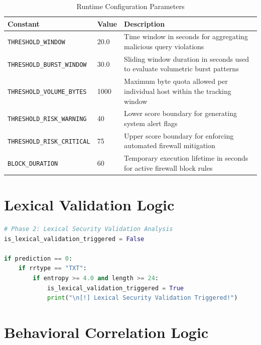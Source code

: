 \documentclass[14pt, a4paper, oneside]{report}
\begin{document}
\begin{table}[H]
\centering
\caption{Runtime Configuration Parameters}
\vspace{0.1cm}
\label{tab:runtime_constants}
\bgroup
\normalsize
\renewcommand{\arraystretch}{1.5}
\begin{tabular}{|l|l|p{7.5cm}|}
\hline
\textbf{Constant} & \textbf{Value} & \textbf{Description} \\ \hline
\texttt{THRESHOLD\_WINDOW} & 20.0 & Time window in seconds for aggregating malicious query violations \\ \hline
\texttt{THRESHOLD\_BURST\_WINDOW} & 30.0 & Sliding window duration in seconds used to evaluate volumetric burst patterns \\ \hline
\texttt{THRESHOLD\_VOLUME\_BYTES} & 1000 & Maximum byte quota allowed per individual host within the tracking window \\ \hline
\texttt{THRESHOLD\_RISK\_WARNING} & 40 & Lower score boundary for generating system alert flags \\ \hline
\texttt{THRESHOLD\_RISK\_CRITICAL} & 75 & Upper score boundary for enforcing automated firewall mitigation \\ \hline
\texttt{BLOCK\_DURATION} & 60 & Temporary execution lifetime in seconds for active firewall block rules \\ \hline
\end{tabular}
\egroup
\end{table}


\section{Lexical Validation Logic}
\label{appendix:sub_lexical}

\begin{lstlisting}[style=appendixstyle, language=python, numbers=none, label={lst:app_lex_logic}]
# Phase 2: Lexical Security Validation Analysis
is_lexical_validation_triggered = False

if prediction == 0:
    if rrtype == "TXT":
        if entropy >= 4.0 and length >= 24:
            is_lexical_validation_triggered = True
            print("\n[!] Lexical Security Validation Triggered!")
\end{lstlisting}

\section{Behavioral Correlation Logic}
\label{appendix:sub_temporal}
\end{document}
